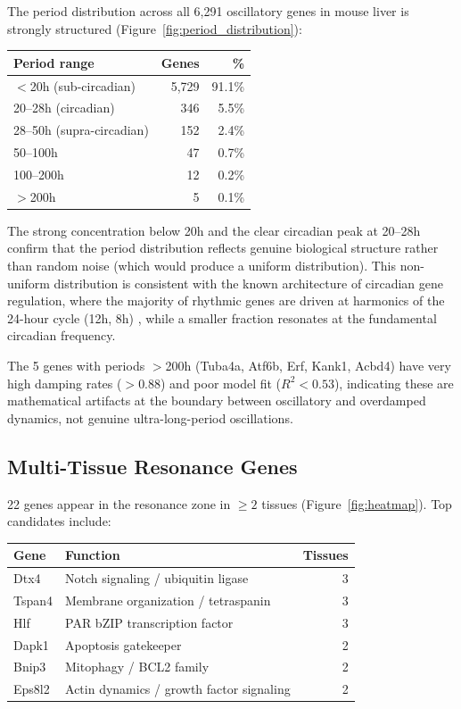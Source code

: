 \documentclass[11pt,letterpaper]{article}
\begin{document}
The period distribution across all 6,291 oscillatory genes in mouse liver is strongly structured (Figure~\ref{fig:period_distribution}):

\begin{center}
\begin{tabular}{lrr}
\toprule
\textbf{Period range} & \textbf{Genes} & \textbf{\%} \\
\midrule
$<$20h (sub-circadian) & 5,729 & 91.1\% \\
20--28h (circadian) & 346 & 5.5\% \\
28--50h (supra-circadian) & 152 & 2.4\% \\
50--100h & 47 & 0.7\% \\
100--200h & 12 & 0.2\% \\
$>$200h & 5 & 0.1\% \\
\bottomrule
\end{tabular}
\end{center}

The strong concentration below 20h and the clear circadian peak at 20--28h confirm that the period distribution reflects genuine biological structure rather than random noise (which would produce a uniform distribution). This non-uniform distribution is consistent with the known architecture of circadian gene regulation, where the majority of rhythmic genes are driven at harmonics of the 24-hour cycle (12h, 8h) \citep{hughes2009harmonics, koike2012transcriptional}, while a smaller fraction resonates at the fundamental circadian frequency.

The 5 genes with periods $>$200h (Tuba4a, Atf6b, Erf, Kank1, Acbd4) have very high damping rates ($>$0.88) and poor model fit ($R^2 < 0.53$), indicating these are mathematical artifacts at the boundary between oscillatory and overdamped dynamics, not genuine ultra-long-period oscillations.

\subsection{Multi-Tissue Resonance Genes}

22 genes appear in the resonance zone in $\geq 2$ tissues (Figure~\ref{fig:heatmap}). Top candidates include:

\begin{center}
\begin{tabular}{llr}
\toprule
\textbf{Gene} & \textbf{Function} & \textbf{Tissues} \\
\midrule
Dtx4 & Notch signaling / ubiquitin ligase & 3 \\
Tspan4 & Membrane organization / tetraspanin & 3 \\
Hlf & PAR bZIP transcription factor & 3 \\
Dapk1 & Apoptosis gatekeeper & 2 \\
Bnip3 & Mitophagy / BCL2 family & 2 \\
Eps8l2 & Actin dynamics / growth factor signaling & 2 \\
\bottomrule
\end{tabular}
\end{center}
\end{document}
